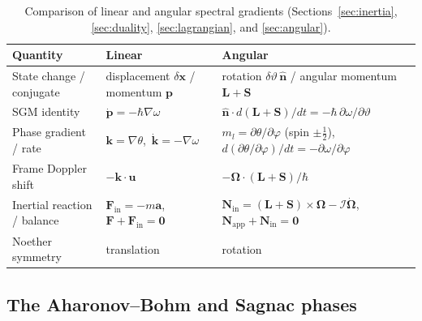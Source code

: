 \documentclass[aps,prd,onecolumn,tightenlines,nofootinbib,notitlepage,10pt,floatfix]{revtex4-2}
\theoremstyle{indentedtheorem}
\begin{document}
\begin{table}[tbp]
\centering
\footnotesize
\caption{Comparison of linear and angular spectral gradients (Sections~\ref{sec:inertia}, \ref{sec:duality}, \ref{sec:lagrangian}, and \ref{sec:angular}).}
\label{tab:linear_angular}
\begin{tabular}{lll}
\toprule
\textbf{Quantity} & \textbf{Linear} & \textbf{Angular} \\
\midrule
State change / conjugate & displacement $\delta\mathbf{x}$ / momentum $\mathbf{p}$ & rotation $\delta\vartheta\,\hat{\mathbf{n}}$ / angular momentum $\mathbf{L}+\mathbf{S}$ \\
SGM identity & $\dot{\mathbf{p}}=-\hbar\nabla\omega$ & $\hat{\mathbf{n}}\cdot d(\mathbf{L}+\mathbf{S})/dt=-\hbar\,\partial\omega/\partial\vartheta$ \\
Phase gradient / rate & $\mathbf{k}=\nabla\theta$,\ $\dot{\mathbf{k}}=-\nabla\omega$ & $m_l=\partial\theta/\partial\varphi$ (spin $\pm\tfrac{1}{2}$),\ $d(\partial\theta/\partial\varphi)/dt=-\partial\omega/\partial\varphi$ \\
Frame Doppler shift & $-\mathbf{k}\cdot\mathbf{u}$ & $-\boldsymbol{\Omega}\cdot(\mathbf{L}+\mathbf{S})/\hbar$ \\
Inertial reaction / balance & $\mathbf{F}_\text{in}=-m\mathbf{a}$,\ $\mathbf{F}+\mathbf{F}_\text{in}=\mathbf{0}$ & $\mathbf{N}_\text{in}=(\mathbf{L}+\mathbf{S})\times\boldsymbol{\Omega}-\mathcal{I}\dot{\boldsymbol{\Omega}}$,\ $\mathbf{N}_\text{app}+\mathbf{N}_\text{in}=\mathbf{0}$ \\
Noether symmetry & translation & rotation \\
\bottomrule
\end{tabular}
\end{table}

\subsection{The Aharonov--Bohm and Sagnac phases}
\label{sec:ab}
\end{document}
